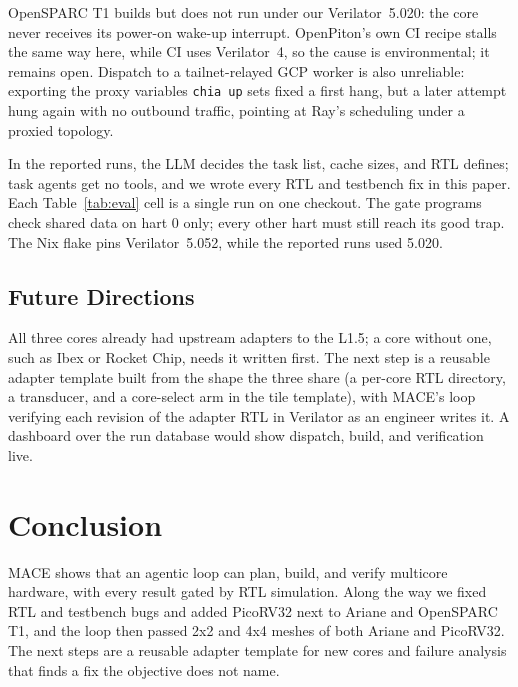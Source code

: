 \documentclass[10pt,conference,compsoc]{IEEEtran}
\newcommand{\code}[1]{\texttt{\small #1}}
\newcommand{\sys}{MACE}
\begin{document}
OpenSPARC T1 builds but does not run under our Verilator~5.020: the core never receives its power-on
wake-up interrupt. OpenPiton's own CI recipe stalls the same way here, while CI uses Verilator~4, so
the cause is environmental; it remains open. Dispatch to a tailnet-relayed GCP worker is also
unreliable: exporting the proxy variables \code{chia up} sets fixed a first hang, but a later attempt
hung again with no outbound traffic, pointing at Ray's scheduling under a proxied topology.

In the reported runs, the LLM decides the task list, cache sizes, and RTL defines; task agents get
no tools, and we wrote every RTL and testbench fix in this paper. Each Table~\ref{tab:eval} cell is
a single run on one checkout. The gate programs check shared data on hart 0 only; every other hart
must still reach its good trap. The Nix flake pins Verilator~5.052, while the reported runs used 5.020.

\subsection{Future Directions}

All three cores already had upstream adapters to the L1.5; a core without one, such as Ibex or
Rocket Chip, needs it written first. The next step is a reusable adapter template built from the
shape the three share (a per-core RTL directory, a transducer, and a core-select arm in the tile
template), with \sys{}'s loop verifying each revision of the adapter RTL in Verilator as an engineer
writes it. A dashboard over the run database would show dispatch, build, and verification live.

\balance
\section{Conclusion}

\sys{} shows that an agentic loop can plan, build, and verify multicore hardware, with every result
gated by RTL simulation. Along the way we fixed RTL and testbench bugs and added PicoRV32 next to
Ariane and OpenSPARC T1, and the loop then passed 2x2 and 4x4 meshes of both Ariane and PicoRV32. The next steps are a reusable
adapter template for new cores and failure analysis that finds a fix the objective does not name.
\end{document}

